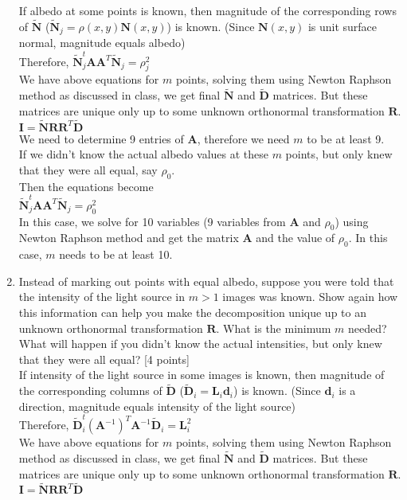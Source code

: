 \documentclass[11pt]{article}
\begin{document}
\begin{enumerate}
If albedo at some points is known, then magnitude of the corresponding rows of $\mathbf{\tilde{N}}$ ($\mathbf{\tilde{N}}_j = \rho(x,y) \mathbf{N}(x,y)$) is known. (Since $\mathbf{N}(x,y)$ is unit surface normal, magnitude equals albedo) \\
Therefore,
$\mathbf{\tilde{N}}_j^t\mathbf{AA}^{T}\mathbf{\tilde{N}}_j = \rho_{j}^{2}$ \\
We have above equations for $m$ points, solving them using Newton Raphson method as discussed in class, we get final $\mathbf{\tilde{N}}$ and $\mathbf{\tilde{D}}$ matrices. But these matrices are unique only up to some unknown orthonormal transformation $\mathbf{R}$. \\
$\mathbf{I} = \mathbf{\tilde{N}} \mathbf{RR}^{T}\mathbf{\tilde{D}}$\\

We need to determine 9 entries of $\mathbf{A}$, therefore we need $m$ to be at least 9.\\

If we didn't know the actual albedo values at these $m$ points, but only knew that they were all equal, say $\rho_{0}$. \\
Then the equations become \\
$\mathbf{\tilde{N}}_j^t\mathbf{AA}^{T}\mathbf{\tilde{N}}_j = \rho_{0}^{2}$ \\
In this case, we solve for 10 variables (9 variables from $\mathbf{A}$ and $\rho_{0}$) using Newton Raphson method and get the matrix $\mathbf{A}$ and the value of $\rho_{0}$. In this case, $m$ needs to be at least 10.\\



\item Instead of marking out points with equal albedo, suppose you were told that the intensity of the light source in $m > 1$ images was known. Show again how this information can help you make the decomposition unique up to an unknown orthonormal transformation $\mathbf{R}$.  What is the minimum $m$ needed?  What will happen if you didn't know the actual intensities, but only knew that they were all equal? \textsf{[4 points]} \\

If intensity of the light source in some images is known, then magnitude of the corresponding columns of $\mathbf{\tilde{D}}$ ($\mathbf{\tilde{D}}_i = \mathbf{L}_{i} \mathbf{d}_{i}$) is known. (Since $\mathbf{d}_{i}$ is a direction, magnitude equals intensity of the light source) \\
Therefore,
$\mathbf{\tilde{D}}_i^t(\mathbf{A}^{-1})^{T}\mathbf{A}^{-1}\mathbf{\tilde{D}}_i = \mathbf{L}_{i}^{2}$ \\
We have above equations for $m$ points, solving them using Newton Raphson method as discussed in class, we get final $\mathbf{\tilde{N}}$ and $\mathbf{\tilde{D}}$ matrices. But these matrices are unique only up to some unknown orthonormal transformation $\mathbf{R}$. \\
$\mathbf{I} = \mathbf{\tilde{N}} \mathbf{RR}^{T}\mathbf{\tilde{D}}$\\


\end{enumerate}
\end{document}
